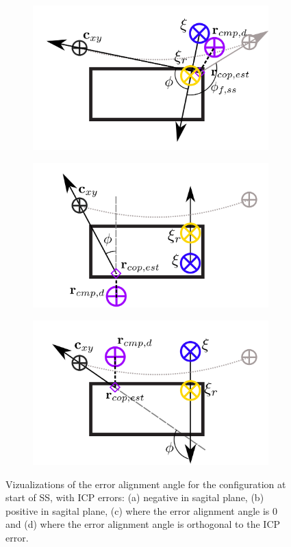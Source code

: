 \begin{figure}[h]
\begin{subfigure}{0.5\textwidth}
    \caption{}
     \label{fig:phiVizc}
  \end{subfigure}
  \begin{subfigure}{0.5\textwidth}
    \centering
  \includegraphics[width=.8\linewidth]{STYLESTUFF/ICPplanStartSSPhiViz90.png}
    \caption{}
     \label{fig:phiVizd}
  \end{subfigure}
    \begin{subfigure}{0.5\textwidth}
    \centering
  \includegraphics[width=.8\linewidth]{STYLESTUFF/ICPplanStartSSPhiVizLeftError.png}
    \caption{}
     \label{fig:phiVize}
  \end{subfigure}
  \begin{subfigure}{0.5\textwidth}
    \centering
  \includegraphics[width=.8\linewidth]{STYLESTUFF/ICPplanStartSSPhiVizRightError.png}
    \caption{}
     \label{fig:phiVizf}
  \end{subfigure}
  \caption{Vizualizations of the error alignment angle for the configuration at start of \ac{SS}, with \ac{ICP} errors: (a) negative in sagital plane, (b) positive in sagital plane, (c) where the error alignment angle is $0$ and (d) where the error alignment angle is orthogonal to the \ac{ICP} error. }
  \label{fig:phiViz}
\end{figure}

